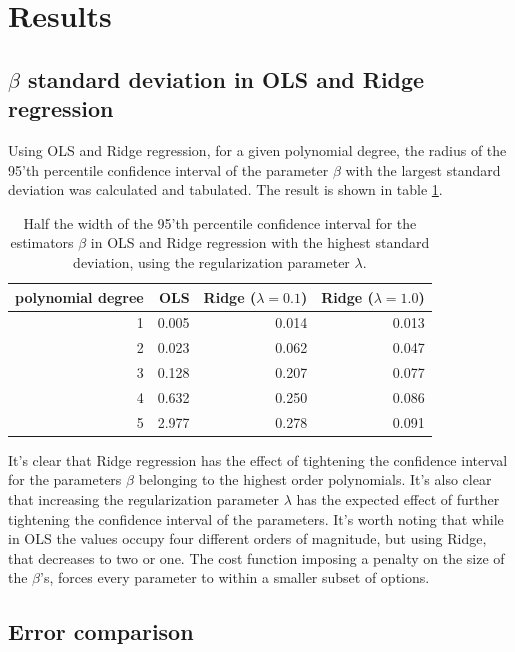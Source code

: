 \documentclass[11pt,a4paper,titlepage]{article}
\begin{document}
\section{Results}

\subsection{$\beta$ standard deviation in OLS and Ridge regression}
Using OLS and Ridge regression, for a given polynomial degree, the radius of the 95'th percentile confidence interval of the parameter $\beta$ with the largest standard deviation was calculated and tabulated. The result is shown in table \ref{betaVarianceTable}.

\begin{table}[H]\caption[Confidence interval of estimators in OLS vs. Ridge]{Half the width of the 95'th percentile confidence interval for the estimators $\beta$ in OLS and Ridge regression with the highest standard deviation, using the regularization parameter $\lambda$. }
\label{betaVarianceTable}
\begin{tabular}{|r|r|r|r|}
\hline
polynomial degree & OLS   & Ridge ($\lambda = 0.1$) & Ridge ($\lambda = 1.0$) \\ \hline
1                 & 0.005 & 0.014                & 0.013          \\
2                 & 0.023 & 0.062                & 0.047          \\
3                 & 0.128 & 0.207                & 0.077          \\
4                 & 0.632 & 0.250                & 0.086          \\
5                 & 2.977 & 0.278                & 0.091 \\ \hline
\end{tabular}
\end{table}
It's clear that Ridge regression has the effect of tightening the confidence interval for the parameters $\beta$ belonging to the highest order polynomials. It's also clear that increasing the regularization parameter $\lambda$ has the expected effect of further tightening the confidence interval of the parameters. It's worth noting that while in OLS the values occupy four different orders of magnitude, but using Ridge, that decreases to two or one. The cost function imposing a penalty on the size of the $\beta$'s, forces every parameter to within a smaller subset of options.

\subsection{Error comparison}
\end{document}
